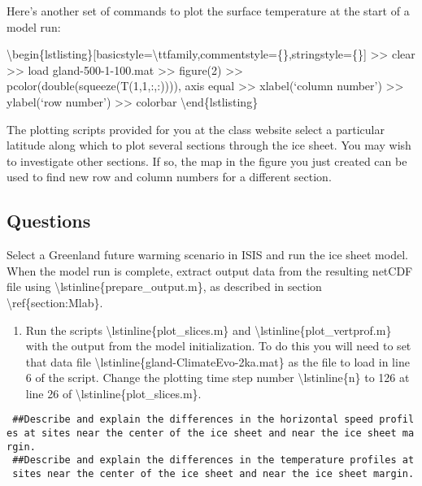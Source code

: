 Here's another set of commands to plot the surface temperature at the
start of a model run:

\textbackslash{}begin\{lstlisting\}{[}basicstyle=\textbackslash{}ttfamily,commentstyle=\{\},stringstyle=\{\}{]}
\textgreater{}\textgreater{} clear \textgreater{}\textgreater{} load
gland-500-1-100.mat \textgreater{}\textgreater{} figure(2)
\textgreater{}\textgreater{} pcolor(double(squeeze(T(1,1,:,:)))), axis
equal \textgreater{}\textgreater{} xlabel(`column number')
\textgreater{}\textgreater{} ylabel(`row number')
\textgreater{}\textgreater{} colorbar \textbackslash{}end\{lstlisting\}

The plotting scripts provided for you at the class website select a
particular latitude along which to plot several sections through the ice
sheet. You may wish to investigate other sections. If so, the map in the
figure you just created can be used to find new row and column numbers
for a different section.

\subsection{Questions}

Select a Greenland future warming scenario in ISIS and run the ice sheet
model. When the model run is complete, extract output data from the
resulting netCDF file using
\textbackslash{}lstinline\{prepare\_output.m\}, as described in section
\textbackslash{}ref\{section:Mlab\}.

\begin{enumerate}
\itemsep1pt\parskip0pt
\item
  Run the scripts \textbackslash{}lstinline\{plot\_slices.m\} and
  \textbackslash{}lstinline\{plot\_vertprof.m\} with the output from the
  model initialization. To do this you will need to set that data file
  \textbackslash{}lstinline\{gland-ClimateEvo-2ka.mat\} as the file to
  load in line 6 of the script. Change the plotting time step number
  \textbackslash{}lstinline\{n\} to 126 at line 26 of
  \textbackslash{}lstinline\{plot\_slices.m\}.
\end{enumerate}

\texttt{~\#\#Describe~and~explain~the~differences~in~the~horizontal~speed~profiles~at~sites~near~the~center~of~the~ice~sheet~and~near~the~ice~sheet~margin.}\\\texttt{~\#\#Describe~and~explain~the~differences~in~the~temperature~profiles~at~sites~near~the~center~of~the~ice~sheet~and~near~the~ice~sheet~margin.}

